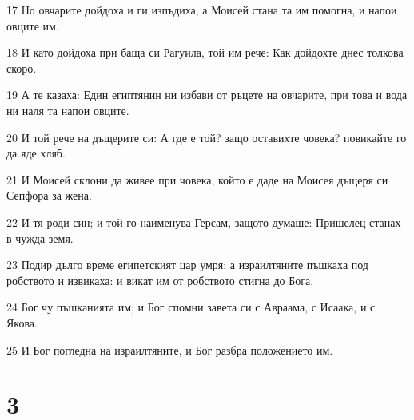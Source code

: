 \par 17 Но овчарите дойдоха и ги изпъдиха; а Моисей стана та им помогна, и напои овците им.
\par 18 И като дойдоха при баща си Рагуила, той им рече: Как дойдохте днес толкова скоро.
\par 19 А те казаха: Един египтянин ни избави от ръцете на овчарите, при това и вода ни наля та напои овците.
\par 20 И той рече на дъщерите си: А где е той? защо оставихте човека? повикайте го да яде хляб.
\par 21 И Моисей склони да живее при човека, който е даде на Моисея дъщеря си Сепфора за жена.
\par 22 И тя роди син; и той го наименува Герсам, защото думаше: Пришелец станах в чужда земя.
\par 23 Подир дълго време египетският цар умря; а израилтяните пъшкаха под робството и извикаха: и викат им от робството стигна до Бога.
\par 24 Бог чу пъшканията им; и Бог спомни завета си с Авраама, с Исаака, и с Якова.
\par 25 И Бог погледна на израилтяните, и Бог разбра положението им.

\chapter{3}

